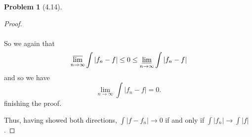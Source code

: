 \documentclass[12pt]{article}
\theoremstyle{definition}
\newtheorem{problem}{Problem}
\begin{document}
\begin{problem}[4.14]
\begin{enumerate}[label = (\alph{*})]
\begin{proof}
\begin{enumerate}
\begin{align*}
                    \end{align*}
                   So we again that
                    \[
                        \varlimsup_{n \to \infty} \int |f_n - f| \leq 0 \leq \varliminf_{n \to \infty} \int |f_n - f|
                    \]
                        and so we have 
                    \[
                        \lim_{n \to \infty } \int |f_n -f| = 0.
                    \]    
                   finishing the proof. 
                \end{enumerate}
            Thus, having showed both directions, \( \displaystyle \int |f - f_n| \to 0 \) if and only if \( \displaystyle \int |f_n| \to \int |f| \).
            \end{proof}
    \end{enumerate}
\end{problem}
\end{document}
